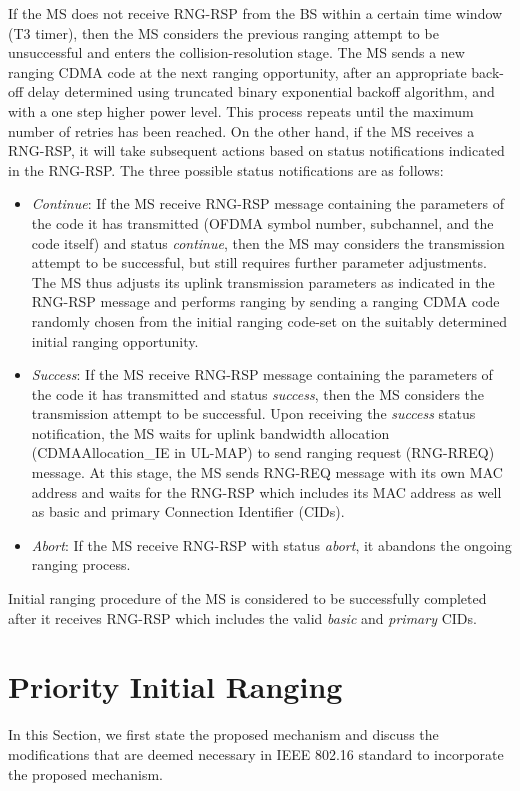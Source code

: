 \documentclass[preprint,12pt]{elsarticle}
\begin{document}
If the MS does not receive RNG-RSP from the BS within a certain time window (T3 timer), then the MS considers the previous ranging attempt to be unsuccessful and enters the collision-resolution stage. The MS sends a new ranging CDMA code at the next ranging opportunity, after an appropriate back-off delay determined using truncated binary exponential backoff algorithm, and with a one step higher power level. This process repeats until the maximum number of retries has been reached. On the other hand, if the MS receives a RNG-RSP, it will take subsequent actions based on status notifications indicated in the RNG-RSP. The three possible status notifications are as follows:
\begin{itemize}
  \item \emph{Continue}: If the MS receive RNG-RSP message containing the parameters of the code it has transmitted (OFDMA symbol number, subchannel, and the code itself) and status \emph{continue}, then the MS may considers the transmission attempt to be successful, but still requires further parameter adjustments. The MS thus adjusts its uplink transmission parameters as indicated in the RNG-RSP message and performs ranging by sending a ranging CDMA code randomly chosen from the initial ranging code-set on the suitably determined initial ranging opportunity.
  \item \emph{Success}: If the MS receive RNG-RSP message containing the parameters of the code it has transmitted and status \emph{success}, then the MS considers the transmission attempt to be successful. Upon receiving the \emph{success} status notification, the MS waits for uplink bandwidth allocation (CDMAAllocation\_IE in UL-MAP) to send ranging request (RNG-RREQ) message.  At this stage, the MS sends RNG-REQ message with its own MAC address and waits for the RNG-RSP which includes its MAC address as well as basic and primary Connection Identifier (CIDs).
  \item \emph{Abort}: If the MS receive RNG-RSP with status \emph{abort}, it abandons the ongoing ranging process.
\end{itemize}
Initial ranging procedure of the MS is considered to be successfully completed after it receives RNG-RSP which includes the valid \emph{basic} and \emph{primary} CIDs.

\section{Priority Initial Ranging}
In this Section, we first state the proposed mechanism and discuss the modifications that are deemed necessary in IEEE 802.16 standard to incorporate the proposed mechanism.
\end{document}
